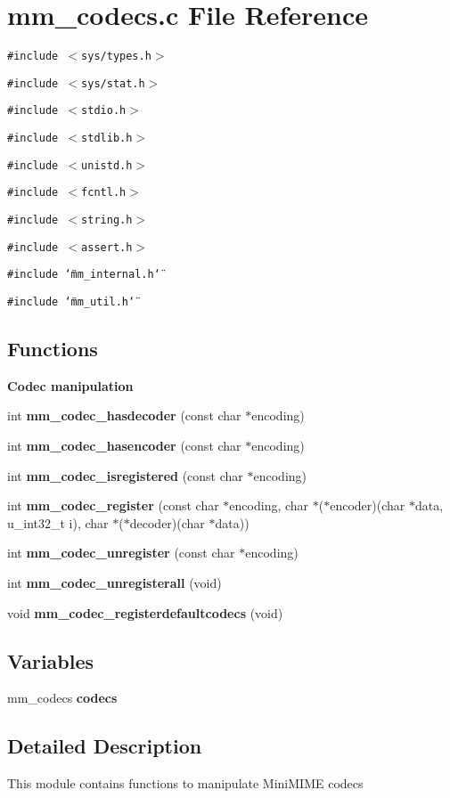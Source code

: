 \section{mm\_\-codecs.c File Reference}
\label{mm__codecs_8c}
{\tt \#include $<$sys/types.h$>$}\par
{\tt \#include $<$sys/stat.h$>$}\par
{\tt \#include $<$stdio.h$>$}\par
{\tt \#include $<$stdlib.h$>$}\par
{\tt \#include $<$unistd.h$>$}\par
{\tt \#include $<$fcntl.h$>$}\par
{\tt \#include $<$string.h$>$}\par
{\tt \#include $<$assert.h$>$}\par
{\tt \#include \char`\"{}mm\_\-internal.h\char`\"{}}\par
{\tt \#include \char`\"{}mm\_\-util.h\char`\"{}}\par
\subsection*{Functions}
\begin{Indent}{\bf Codec manipulation}\par
\begin{CompactItemize}
\item 
int {\bf mm\_\-codec\_\-hasdecoder} (const char $\ast$encoding)
\item 
int {\bf mm\_\-codec\_\-hasencoder} (const char $\ast$encoding)
\item 
int {\bf mm\_\-codec\_\-isregistered} (const char $\ast$encoding)
\item 
int {\bf mm\_\-codec\_\-register} (const char $\ast$encoding, char $\ast$($\ast$encoder)(char $\ast$data, u\_\-int32\_\-t i), char $\ast$($\ast$decoder)(char $\ast$data))
\item 
int {\bf mm\_\-codec\_\-unregister} (const char $\ast$encoding)
\item 
int {\bf mm\_\-codec\_\-unregisterall} (void)
\item 
void {\bf mm\_\-codec\_\-registerdefaultcodecs} (void)
\end{CompactItemize}
\end{Indent}
\subsection*{Variables}
\begin{CompactItemize}
\item 
mm\_\-codecs \textbf{codecs}\label{mm__codecs_8c_b669b6dc7c7d10408d8da81b3f1a30d3}

\end{CompactItemize}


\subsection{Detailed Description}
This module contains functions to manipulate Mini\-MIME codecs 